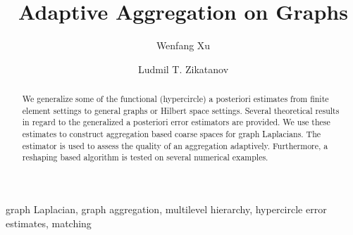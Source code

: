 \documentclass[ ]{elsarticle}
\numberwithin{equation}{section}
\begin{document}
\makeatletter
\def\@author#1{\g@addto@macro\elsauthors{\normalsize%
    \def\baselinestretch{1}%
    \upshape\authorsep#1\unskip\textsuperscript{%
      \ifx\@fnmark\@empty\else\unskip\sep\@fnmark\let\sep=,\fi
      \ifx\@corref\@empty\else\unskip\sep\@corref\let\sep=,\fi
    }%
    \def\authorsep{\unskip,\space}%
    \global\let\@fnmark\@empty
    \global\let\@corref\@empty  %
    \global\let\sep\@empty}%
  \@eadauthor={#1}
}
\makeatother


\begin{frontmatter}


\title{Adaptive Aggregation on Graphs}

  
\author{Wenfang Xu}

\address{Department of Mathematics, The Pennsylvania State University,
  University Park, PA 16802, USA\, {Email:} wxx107@psu.edu}

\author{Ludmil T. Zikatanov}

\address{Department of Mathematics, The Pennsylvania State University,
  University Park, PA 16802, USA\, {Email:} ludmil@psu.edu\\
  Institute for Mathematics and Informatics, Bulgarian Academy of
  Sciences, Sofia, Bulgaria}

\begin{abstract}
We generalize some of the functional (hypercircle) a
posteriori estimates from finite element settings to general graphs
or Hilbert space settings. Several theoretical results in regard to
the generalized a posteriori error estimators are provided. We use
these estimates to construct aggregation based coarse spaces for
graph Laplacians. The estimator is used to assess the quality of an
aggregation adaptively. Furthermore, a reshaping based algorithm is
tested on several numerical examples.
\end{abstract}

\begin{keyword}{graph Laplacian, graph aggregation, multilevel hierarchy,
  hypercircle error estimates, matching}

\end{keyword}
\end{frontmatter}
\end{document}
